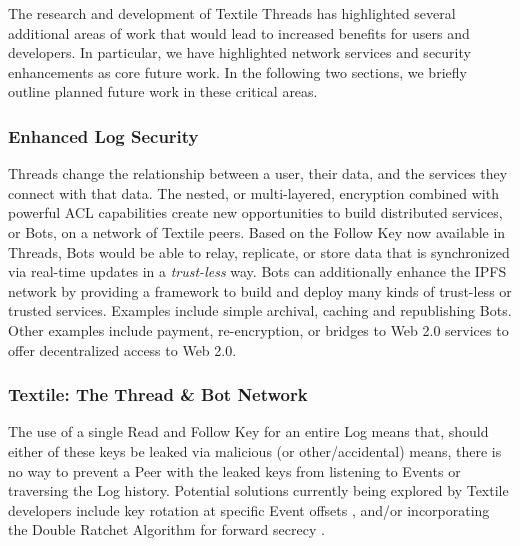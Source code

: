 \documentclass{textile}
\begin{document}
The research and development of Textile Threads has highlighted several additional areas of work that would lead to increased benefits for users and developers. In particular, we have highlighted network services and security enhancements as core future work. In the following two sections, we briefly outline planned future work in these critical areas.

\subsubsection{Enhanced Log Security}

Threads change the relationship between a user, their data, and the services they connect with that data. The nested, or multi-layered, encryption combined with powerful ACL capabilities create new opportunities to build distributed services, or Bots, on a network of Textile peers. Based on the Follow Key now available in Threads, Bots would be able to relay, replicate, or store data that is synchronized via real-time updates in a \emph{trust-less} way. Bots can additionally enhance the IPFS network by providing a framework to build and deploy many kinds of trust-less or trusted services. Examples include simple archival, caching and republishing Bots. Other examples include payment, re-encryption, or bridges to Web 2.0 services to offer decentralized access to Web 2.0.

\subsubsection{Textile: The Thread \& Bot Network} \label{sec:Bots}

The use of a single Read and Follow Key for an entire Log means that, should either of these keys be leaked via malicious (or other/accidental) means, there is no way to prevent a Peer with the leaked keys from listening to Events or traversing the Log history. Potential solutions currently being explored by Textile developers include key rotation at specific Event offsets \cite{KeyRotation}, and/or incorporating the Double Ratchet Algorithm \cite{marlinspikeDoubleRatchetAlgorithm2016} for forward secrecy \cite{ungerSoKSecureMessaging2015}.



\nocite{*}




\appendix
\end{document}
